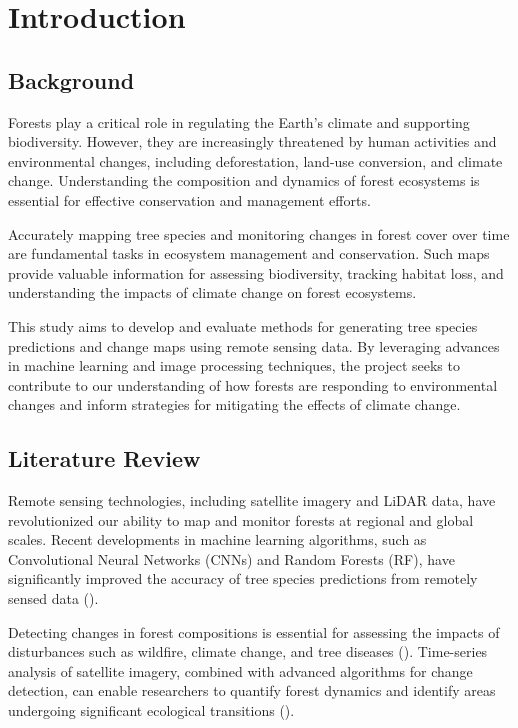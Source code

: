 \chapter{Introduction}
\label{chapter:intro}
\section{Background}

Forests play a critical role in regulating the Earth's climate and supporting biodiversity. However, they are increasingly threatened by human activities and environmental changes, including deforestation, land-use conversion, and climate change. Understanding the composition and dynamics of forest ecosystems is essential for effective conservation and management efforts.

Accurately mapping tree species and monitoring changes in forest cover over time are fundamental tasks in ecosystem management and conservation. Such maps provide valuable information for assessing biodiversity, tracking habitat loss, and understanding the impacts of climate change on forest ecosystems.

This study aims to develop and evaluate methods for generating tree species predictions and change maps using remote sensing data. By leveraging advances in machine learning and image processing techniques, the project seeks to contribute to our understanding of how forests are responding to environmental changes and inform strategies for mitigating the effects of climate change.

\section{Literature Review}

Remote sensing technologies, including satellite imagery and LiDAR data, have revolutionized our ability to map and monitor forests at regional and global scales. Recent developments in machine learning algorithms, such as Convolutional Neural Networks (CNNs) and Random Forests (RF), have significantly improved the accuracy of tree species predictions from remotely sensed data (\cite{belgium_classification, copernicus_main, germany_bavaria}).

Detecting changes in forest compositions is essential for assessing the impacts of disturbances such as wildfire, climate change, and tree diseases (\cite{usda}). Time-series analysis of satellite imagery, combined with advanced algorithms for change detection, can enable researchers to quantify forest dynamics and identify areas undergoing significant ecological transitions (\cite{indonesia}).

